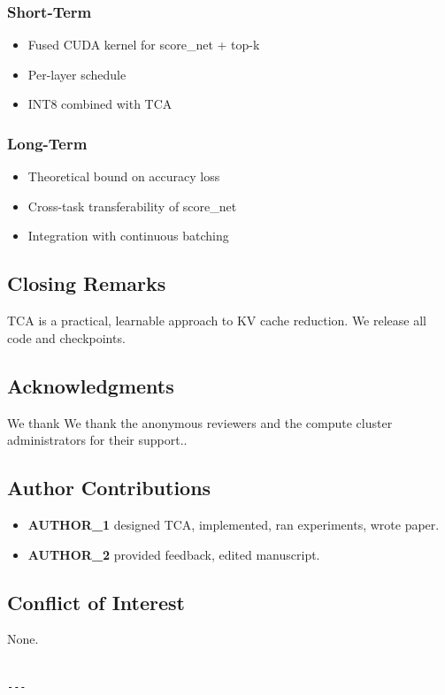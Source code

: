 \subsubsection{Short-Term}
\begin{itemize}
\item Fused CUDA kernel for score\_net + top-k
\item Per-layer   schedule
\item INT8 combined with TCA

\end{itemize}
\subsubsection{Long-Term}
\begin{itemize}
\item Theoretical bound on accuracy loss
\item Cross-task transferability of score\_net
\item Integration with continuous batching

\end{itemize}
\subsection{Closing Remarks}

TCA is a practical, learnable approach to KV cache reduction. We release all 
code and checkpoints.

\subsection{Acknowledgments}

We thank We thank the anonymous reviewers and the compute cluster administrators for their support..

\subsection{Author Contributions}

\begin{itemize}
\item \textbf{{{AUTHOR\_1}}} designed TCA, implemented, ran experiments, wrote paper.
\item \textbf{{{AUTHOR\_2}}} provided feedback, edited manuscript.

\end{itemize}
\subsection{Conflict of Interest}

None.
\begin{lstlisting}

---
\end{lstlisting}